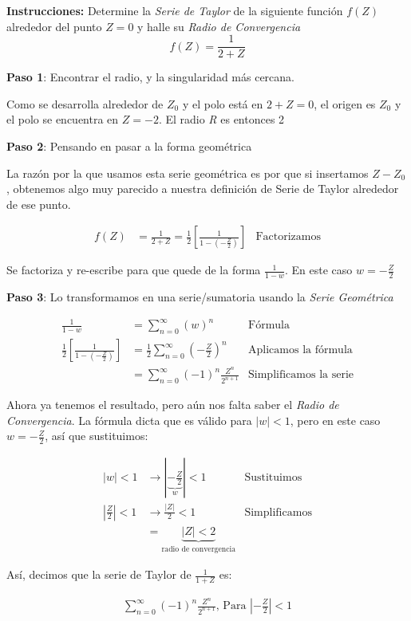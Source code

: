 \textbf{Instrucciones:} Determine la \textit{Serie de Taylor} de la siguiente función $f(Z)$ alrededor del punto $Z = 0$ y halle su \textit{Radio de Convergencia} \[ f(Z) = \frac{1}{2 + Z} \]

\textbf{Paso 1}: Encontrar el radio, y la singularidad más cercana.

Como se desarrolla alrededor de $Z_0$ y el polo está en $2 + Z = 0$, el origen es $Z_0$ y el polo se encuentra en $Z = -2$. El radio \textit{R} es entonces 2

\textbf{Paso 2}: Pensando en pasar a la forma geométrica



La razón por la que usamos esta serie geométrica es por que si insertamos $Z - Z_0$, obtenemos algo muy parecido a nuestra definición de Serie de Taylor alrededor de ese punto.

\begin{align}
    f(Z) &= \frac{1}{2 + Z} =  \frac{1}{2} \left[ \frac{1}{1 - (-\frac{Z}{2})}\right] &\text{Factorizamos} \nonumber
\end{align}

Se factoriza y re-escribe para que quede de la forma \( \frac{1}{1 - w} \). En este caso $w = -\frac{Z}{2}$

\textbf{Paso 3}: Lo transformamos en una serie/sumatoria usando la \textit{Serie Geométrica}

\begin{align}
    \frac{1}{1-w} &= \sum_{n=0}^{\infty} (w)^n &\text{Fórmula} \nonumber \\
    \frac{1}{2} \left[ \frac{1}{1 - (-\frac{Z}{2})}\right] &=
        \frac{1}{2} \sum_{n=0}^{\infty} \left(-\frac{Z}{2}\right)^n
        &\text{Aplicamos la fórmula} \nonumber \\
    &= \sum_{n=0}^{\infty} (-1)^n \frac{Z^n}{2^{n+1}}
        &\text{Simplificamos la serie} \nonumber
\end{align}

Ahora ya tenemos el resultado, pero aún nos falta saber el \textit{Radio de Convergencia}. La fórmula dicta que es válido para $|w| < 1$, pero en este caso $w = -\frac{Z}{2}$, así que sustituimos:

\begin{align}
    |w| < 1 &\longrightarrow |\underbrace{-\frac{Z}{2}}_{w}| < 1
        & \text{Sustituimos} \nonumber \\
    \left| \frac{Z}{2} \right| < 1 &\longrightarrow
        \frac{|Z|}{2} < 1 & \text{Simplificamos} \nonumber \\
    &= \underbrace{|Z| < 2}_{\text{radio de convergencia}} \nonumber
\end{align}

Así, decimos que la serie de 
Taylor de \( \frac{1}{1+Z} \) es:

\begin{align}
    \sum_{n=0}^{\infty} (-1)^n \frac{Z^n}{2^{n+1}} \text{, Para } |-\frac{Z}{2}| < 1 \nonumber
\end{align}